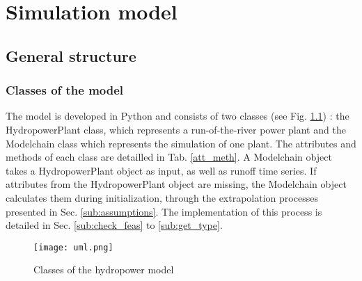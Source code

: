 \chapter{Simulation model}
\label{chap:simulation_model}

\section{General structure}

\subsection{Classes of the model}
The model is developed in Python and consists of two classes (see Fig. \ref{uml}) : the HydropowerPlant class, which represents a run-of-the-river power plant and the Modelchain class which represents the simulation of one plant. The attributes and methods of each class are detailled in Tab. \ref{att_meth}. \newline
A Modelchain object takes a HydropowerPlant object as input, as well as runoff time series. If attributes from the HydropowerPlant object are missing, the Modelchain object calculates them during initialization, through the extrapolation processes presented in Sec. \ref{sub:assumptions}. The implementation of this process is detailed in Sec. \ref{sub:check_feas} to \ref{sub:get_type}.
\begin{figure}[H]
\centering
\texttt{[image: uml.png]}
\caption{Classes of the hydropower model}
\label{uml}
\end{figure}

